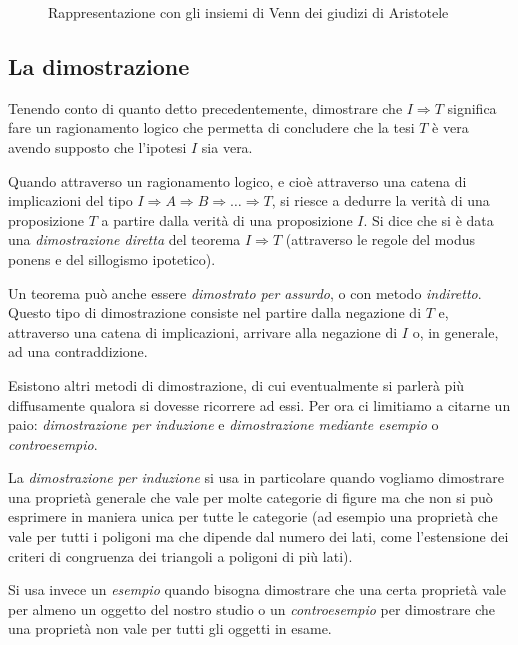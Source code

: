 \begin{inaccessibleblock}
 \begin{figure}[bth]
 \centering
 \caption{Rappresentazione con gli insiemi di Venn dei giudizi di 
Aristotele}\label{fig:1.1}
\end{figure}
\end{inaccessibleblock}

\subsection{La dimostrazione}

Tenendo conto di quanto detto precedentemente, dimostrare che 
$I\Rightarrow T$ significa fare un ragionamento logico che permetta 
di concludere che la tesi $T$ è vera avendo supposto che l'ipotesi 
$I$ sia vera.

Quando attraverso un ragionamento logico, e cioè attraverso una 
catena di implicazioni del tipo  $I\Rightarrow A\Rightarrow 
B\Rightarrow \ldots{} \Rightarrow T$, si riesce a dedurre la verità 
di una proposizione $T$ a partire dalla verità di una proposizione 
$I$. Si dice che si è data una \emph{dimostrazione diretta} del 
teorema $I\Rightarrow T$ (attraverso le regole del modus ponens e del 
sillogismo ipotetico).

Un teorema può anche essere \emph{dimostrato per assurdo}, o con 
metodo \emph{indiretto}. Questo tipo di dimostrazione consiste nel 
partire dalla negazione di $T$ e, attraverso una catena di 
implicazioni, arrivare alla negazione di $I$ o, in generale, ad una 
contraddizione.

Esistono altri metodi di dimostrazione, di cui eventualmente si 
parlerà più diffusamente qualora si dovesse ricorrere ad essi. Per 
ora ci limitiamo a citarne un paio: \emph{dimostrazione per 
induzione} e \emph{dimostrazione mediante esempio} o 
\emph{controesempio}.

La \emph{dimostrazione per induzione} si usa in particolare quando 
vogliamo dimostrare una proprietà generale che vale per molte 
categorie di figure ma che non si può esprimere in maniera unica per 
tutte le categorie (ad esempio una proprietà che vale per tutti i 
poligoni ma che dipende dal numero dei lati, come l'estensione dei 
criteri di congruenza dei triangoli a poligoni di più lati).

Si usa invece un \emph{esempio} quando bisogna dimostrare che una 
certa proprietà vale per almeno un oggetto del nostro studio o un 
\emph{controesempio} per dimostrare che una proprietà non vale per 
tutti gli oggetti in esame.

